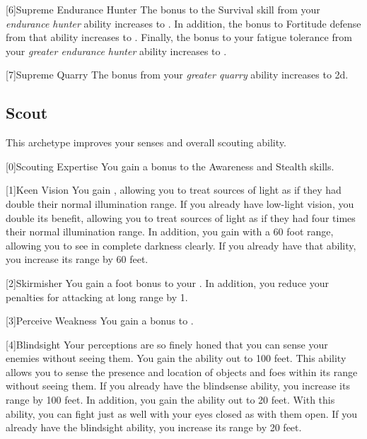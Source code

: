         [6]{Supreme Endurance Hunter} The bonus to the Survival skill from your \textit{endurance hunter} ability increases to .
        In addition, the bonus to Fortitude defense from that ability increases to .
        Finally, the bonus to your fatigue tolerance from your \textit{greater endurance hunter} ability increases to .

        [7]{Supreme Quarry} The bonus from your \textit{greater quarry} ability increases to \plus2d.

    \newpage
    \subsection{Scout}
        This archetype improves your senses and overall scouting ability.

        [0]{Scouting Expertise} You gain a  bonus to the Awareness and Stealth skills.

        [1]{Keen Vision}
        You gain , allowing you to treat sources of light as if they had double their normal illumination range.
        If you already have low-light vision, you double its benefit, allowing you to treat sources of light as if they had four times their normal illumination range.
        In addition, you gain  with a 60 foot range, allowing you to see in complete darkness clearly.
        If you already have that ability, you increase its range by 60 feet.

        [2]{Skirmisher} You gain a  foot bonus to your .
        In addition, you reduce your  penalties for attacking at long range by 1.

        [3]{Perceive Weakness} You gain a  bonus to .

        [4]{Blindsight} Your perceptions are so finely honed that you can sense your enemies without seeing them.
        You gain the  ability out to 100 feet.
        This ability allows you to sense the presence and location of objects and foes within its range without seeing them.
        If you already have the blindsense ability, you increase its range by 100 feet.
        In addition, you gain the  ability out to 20 feet.
        With this ability, you can fight just as well with your eyes closed as with them open.
        If you already have the blindsight ability, you increase its range by 20 feet.

